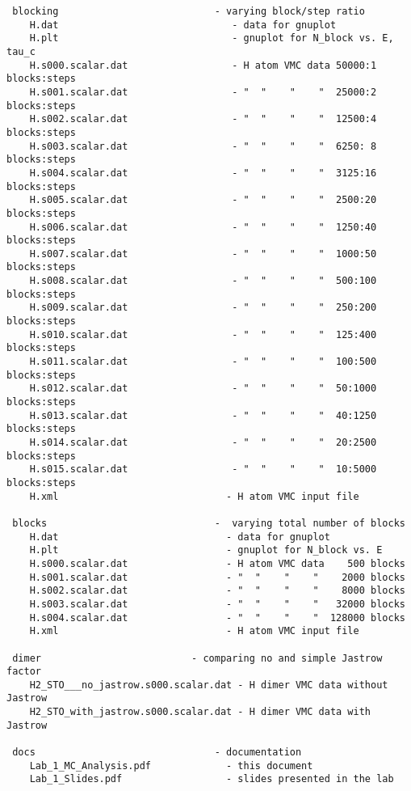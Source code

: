 \begin{shaded}
\begin{verbatim}
 blocking                           - varying block/step ratio
    H.dat                              - data for gnuplot
    H.plt                              - gnuplot for N_block vs. E, tau_c
    H.s000.scalar.dat                  - H atom VMC data 50000:1 blocks:steps
    H.s001.scalar.dat                  - "  "    "    "  25000:2 blocks:steps
    H.s002.scalar.dat                  - "  "    "    "  12500:4 blocks:steps
    H.s003.scalar.dat                  - "  "    "    "  6250: 8 blocks:steps
    H.s004.scalar.dat                  - "  "    "    "  3125:16 blocks:steps
    H.s005.scalar.dat                  - "  "    "    "  2500:20 blocks:steps
    H.s006.scalar.dat                  - "  "    "    "  1250:40 blocks:steps
    H.s007.scalar.dat                  - "  "    "    "  1000:50 blocks:steps
    H.s008.scalar.dat                  - "  "    "    "  500:100 blocks:steps
    H.s009.scalar.dat                  - "  "    "    "  250:200 blocks:steps
    H.s010.scalar.dat                  - "  "    "    "  125:400 blocks:steps
    H.s011.scalar.dat                  - "  "    "    "  100:500 blocks:steps
    H.s012.scalar.dat                  - "  "    "    "  50:1000 blocks:steps
    H.s013.scalar.dat                  - "  "    "    "  40:1250 blocks:steps
    H.s014.scalar.dat                  - "  "    "    "  20:2500 blocks:steps
    H.s015.scalar.dat                  - "  "    "    "  10:5000 blocks:steps
    H.xml                             - H atom VMC input file

 blocks                             -  varying total number of blocks
    H.dat                             - data for gnuplot
    H.plt                             - gnuplot for N_block vs. E
    H.s000.scalar.dat                 - H atom VMC data    500 blocks
    H.s001.scalar.dat                 - "  "    "    "    2000 blocks
    H.s002.scalar.dat                 - "  "    "    "    8000 blocks
    H.s003.scalar.dat                 - "  "    "    "   32000 blocks
    H.s004.scalar.dat                 - "  "    "    "  128000 blocks
    H.xml                             - H atom VMC input file 

 dimer                          - comparing no and simple Jastrow factor
    H2_STO___no_jastrow.s000.scalar.dat - H dimer VMC data without Jastrow
    H2_STO_with_jastrow.s000.scalar.dat - H dimer VMC data with Jastrow

 docs                               - documentation
    Lab_1_MC_Analysis.pdf             - this document
    Lab_1_Slides.pdf                  - slides presented in the lab


\end{verbatim}
\end{shaded}
